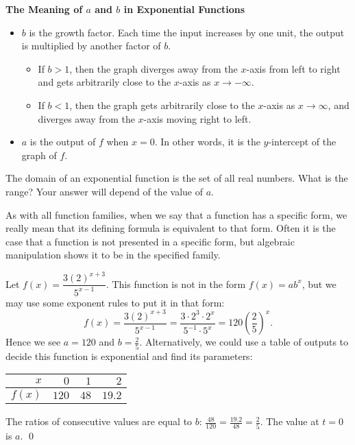 \begin{eg}
\begin{tcolorbox}
{\bf The Meaning of $a$ and $b$ in Exponential Functions}\\
\begin{itemize}
\item $b$ is the growth factor. Each time the input increases by one unit, the output is multiplied by another factor of $b$.
\begin{itemize}
\item If $b>1$, then the graph diverges away from the $x$-axis from left to right and gets arbitrarily close to the $x$-axis as $x\to-\infty$.
\item If $b<1$, then the graph gets arbitrarily close to the $x$-axis as $x\to\infty$, and diverges away from the $x$-axis moving right to left.
\end{itemize}
\item $a$ is the output of $f$ when $x=0$. In other words, it is the $y$-intercept of the graph of $f$.
\end{itemize}
\end{tcolorbox}

\begin{question} The domain of an exponential function is the set of all real numbers. What is the range?  Your answer will  depend of the value of $a$.
\end{question}

\par

As with all function families, when we say that a function has a specific form, we really mean that its defining formula is equivalent to that form. Often it is the case that a function is not presented in a specific form, but algebraic manipulation shows it to be in the specified family.

\par

\begin{eg} Let $f(x) = \dfrac{3(2)^{x+3}}{5^{x-1}}$. This function is not in the form $f(x) = ab^x$, but we may use some exponent rules to put it in that form:
\[
f(x) = \frac{3(2)^{x+3}}{5^{x-1}} = \frac{3\cdot 2^3\cdot 2^{x}}{5^{-1}\cdot 5^{x}} = 120\left(\frac{2}{5}\right)^{x}.
\]
Hence we see $a = 120$ and $b=\frac{2}{5}$. Alternatively, we could use a table of outputs to decide this function is exponential and find its parameters:\\
\begin{center}
\begin{tabular}{|r|| r |r |r|}
\hline $x$ & $0$ & $1$ & $2$ \\
\hline $f(x)$ & $120$ & $48$ & $19.2$\\
\hline
\end{tabular}
\end{center}
The ratios of consecutive values are equal to $b$: $\frac{48}{120} = \frac{19.2}{48} =\frac{2}{5}$. The value at $t=0$ is $a$. \qed \end{eg}


\end{eg}
